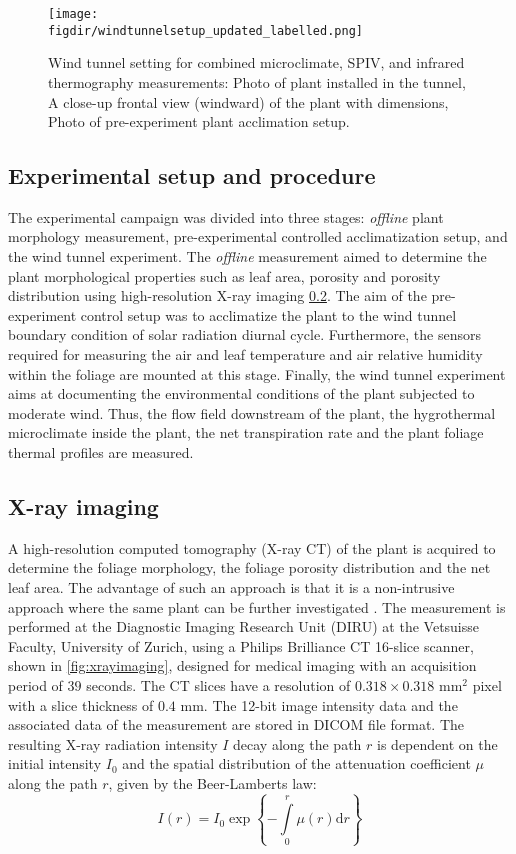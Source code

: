 \begin{figure}[t]
	\centering
	\texttt{[image: \\figdir/windtunnelsetup\_updated\_labelled.png]}
	\caption{Wind tunnel setting for combined microclimate, SPIV, and infrared thermography measurements:  Photo of plant installed in the tunnel,  A close-up frontal view (windward) of the plant with dimensions,  Photo of pre-experiment plant acclimation setup.}
	\label{fig:plant_setup}
\end{figure}


\subsection{Experimental setup and procedure}

The experimental campaign was divided into three stages: \textit{offline} plant morphology measurement, pre-experimental controlled acclimatization setup, and the wind tunnel experiment. The \textit{offline} measurement aimed to determine the plant morphological properties such as leaf area, porosity and porosity distribution using high-resolution X-ray imaging \cref{subsec:xray}. The aim of the pre-experiment control setup was to acclimatize the plant to the wind tunnel boundary condition of solar radiation diurnal cycle. Furthermore, the sensors required for measuring the air and leaf temperature and air relative humidity within the foliage are mounted at this stage. Finally, the wind tunnel experiment aims at documenting the environmental conditions of the plant subjected to moderate wind. Thus, the flow field downstream of the plant, the hygrothermal microclimate inside the plant, the net transpiration rate and the plant foliage thermal profiles are measured.

\subsection{X-ray imaging}
\label{subsec:xray}

A high-resolution computed tomography (X-ray CT) of the plant is acquired to determine the foliage morphology, the foliage porosity distribution and the net leaf area. The advantage of such an approach is that it is a non-intrusive approach where the same plant can be further investigated \citep{Lal2017,Patera2018}. The measurement is performed at the Diagnostic Imaging Research Unit (DIRU) at the Vetsuisse Faculty, University of Zurich, using a Philips Brilliance CT 16-slice scanner, shown in \cref{fig:xrayimaging}, designed for medical imaging with an acquisition period of $39$ seconds. The CT slices have a resolution of $0.318\times0.318$  mm$^2$ pixel with a slice thickness of $0.4$ mm. The 12-bit image intensity data and the associated data of the measurement are stored in DICOM file format. The resulting X-ray radiation intensity $I$ decay along the path $r$ is dependent on the initial intensity $I_0$ and the spatial distribution of the attenuation coefficient $\mu$ along the path $r$, given by the Beer-Lamberts law:
\begin{equation}
I(r) = {I_0}\exp \left\{ { - \int\limits_0^r {\mu \left( r \right){\mathrm{d}}r} } \right\}
\end{equation}

